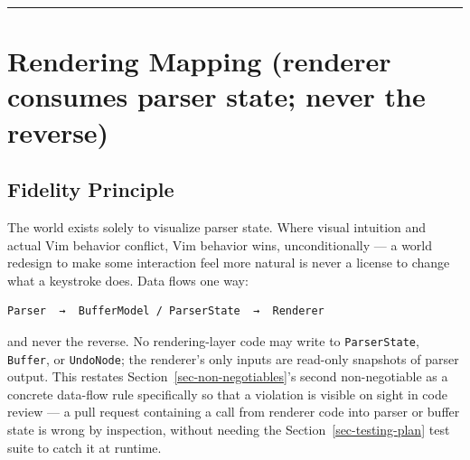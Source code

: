 \documentclass[11pt]{article}
\begin{document}
\begin{center}\rule{0.5\linewidth}{0.5pt}\end{center}

\hypertarget{sec-rendering-mapping-renderer-consumes-parser-state-never-the-reverse}{%
\section{Rendering Mapping (renderer consumes parser state; never the reverse)}\label{sec-rendering-mapping-renderer-consumes-parser-state-never-the-reverse}}

\hypertarget{sec-fidelity-principle}{%
\subsection{Fidelity Principle}\label{sec-fidelity-principle}}

The world exists solely to visualize parser state. Where visual intuition
and actual Vim behavior conflict, Vim behavior wins, unconditionally --- a
world redesign to make some interaction feel more natural is never a
license to change what a keystroke does. Data flows one way:

\begin{Verbatim}[breaklines=true, breakanywhere=true, fontsize=\small]
Parser  →  BufferModel / ParserState  →  Renderer
\end{Verbatim}

and never the reverse. No rendering-layer code may write to \texttt{ParserState},
\texttt{Buffer}, or \texttt{UndoNode}; the renderer's only inputs are read-only snapshots
of parser output. This restates Section~\ref{sec-non-negotiables}'s second non-negotiable as a
concrete data-flow rule specifically so that a violation is visible on
sight in code review --- a pull request containing a call from renderer code
into parser or buffer state is wrong by inspection, without needing the
Section~\ref{sec-testing-plan} test suite to catch it at runtime.
\end{document}
